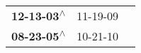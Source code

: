 \begin{supertabular}{lll}
 \textbf{12-13-03\textsuperscript{$\wedge$}} &  11-19-09\textsuperscript{} \\
 \textbf{08-23-05\textsuperscript{$\wedge$}} &  10-21-10\textsuperscript{} \\
\end{supertabular}
